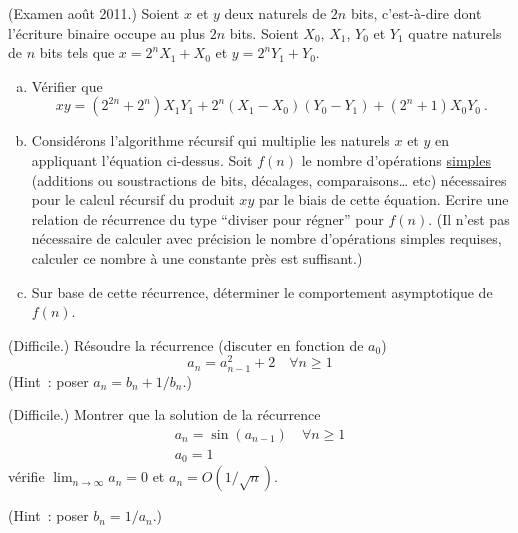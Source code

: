\begin{exo} (Examen ao\^ut 2011.)
Soient $x$ et $y$ deux naturels de $2n$ bits, c'est-\`a-dire dont l'\'ecriture binaire occupe au plus $2n$ bits. %
Soient $X_0$, $X_1$, $Y_0$ et $Y_1$ quatre naturels de $n$ bits tels que $x = 2^n X_1 + X_0$ et $y = 2^n Y_1 + Y_0$.\medskip

\begin{enumerate}[a)]
\item V\'erifier que
%
$$
xy = (2^{2n} + 2^n) X_1 Y_1 + 2^n (X_1 - X_0)(Y_0 - Y_1) + (2^n + 1)X_0Y_0\ .
$$

\item Consid\'erons l'algorithme r\'ecursif qui multiplie les naturels $x$ et $y$ en appliquant l'\'equation ci-dessus. Soit $f(n)$ le nombre d'op\'erations \underline{simples} (additions ou soustractions de bits, d\'ecalages, comparaisons\ldots{} etc) n\'ecessaires pour le calcul r\'ecursif du produit $xy$ par le biais de cette \'equation. Ecrire une relation de r\'ecurrence du type ``diviser pour r\'egner'' pour $f(n)$. (Il n'est pas n\'ecessaire de calculer avec pr\'ecision le nombre d'op\'erations simples requises, calculer ce nombre \`a une constante pr\`es est suffisant.)

\item Sur base de cette r\'ecurrence, d\'eterminer le comportement asymptotique de $f(n)$.
\end{enumerate}
\end{exo}

\begin{exo} (Difficile.)
R\'esoudre la r\'ecurrence (discuter en fonction de $a_0$)
$$
a_n = a_{n-1}^2 + 2 \quad \forall n \geqslant 1
$$
(Hint~: poser $a_n = b_n + 1/b_n$.)
\end{exo}

\begin{exo} (Difficile.)
Montrer que la solution de la r\'ecurrence 
$$
\begin{array}{l}
a_n = \sin (a_{n-1}) \quad \forall n \geqslant 1\\
a_0 = 1
\end{array}
$$
v\'erifie $\lim_{n \to \infty} a_n = 0$ et $a_n = O(1/\sqrt{n})$.

(Hint~: poser $b_n = 1/a_{n}$.)
\end{exo}